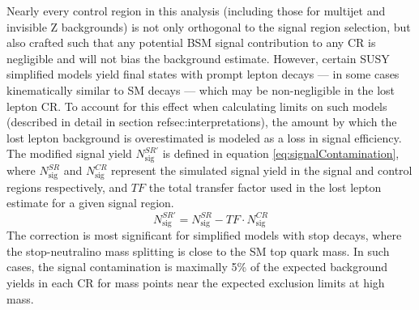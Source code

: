 Nearly every control region in this analysis (including those for multijet and invisible Z backgrounds) is not only orthogonal to the signal region selection, but also crafted such that any potential BSM signal contribution to any CR is negligible and will not bias the background estimate. However, certain SUSY simplified models yield final states with prompt lepton decays --- in some cases kinematically similar to SM \ttbar decays --- which may be non-negligible in the lost lepton CR. To account for this effect when calculating limits on such models (described in detail in section ref{sec:interpretations}), the amount by which the lost lepton background is overestimated is modeled as a loss in signal efficiency. The modified signal yield $N_{\mathrm{sig}}^{SR\prime}$ is defined in equation \ref{eq:signalContamination}, where $N_{\mathrm{sig}}^{SR}$ and $N_{\mathrm{sig}}^{CR}$ represent the simulated signal yield in the signal and control regions respectively, and $TF$ the total transfer factor used in the lost lepton estimate for a given signal region. 
\begin{equation}
	N_{\mathrm{sig}}^{SR\prime} = N_{\mathrm{sig}}^{SR} - TF \cdot N_{\mathrm{sig}}^{CR}
	\label{eq:signalContamination}
\end{equation}
The correction is most significant for simplified models with stop decays, where the stop-neutralino mass splitting is close to the SM top quark mass. In such cases, the signal contamination is maximally 5\% of the expected background yields in each CR for mass points near the expected exclusion limits at high mass.


